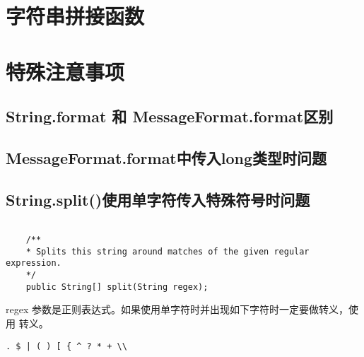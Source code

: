 \section{字符串拼接函数}


\section{特殊注意事项}

\subsection{String.format 和 MessageFormat.format区别}


\subsection{MessageFormat.format中传入long类型时问题}


\subsection{String.split()使用单字符传入特殊符号时问题}

\begin{lstlisting}[style=cjava]

    /**
    * Splits this string around matches of the given regular expression.
    */
    public String[] split(String regex);

\end{lstlisting}

regex 参数是正则表达式。如果使用单字符时并出现如下字符时一定要做转义，使用 \menlo{$\backslash$$\backslash$} 转义。

\begin{lstlisting}[style=cjava]
    . $ | ( ) [ { ^ ? * + \\
\end{lstlisting}


